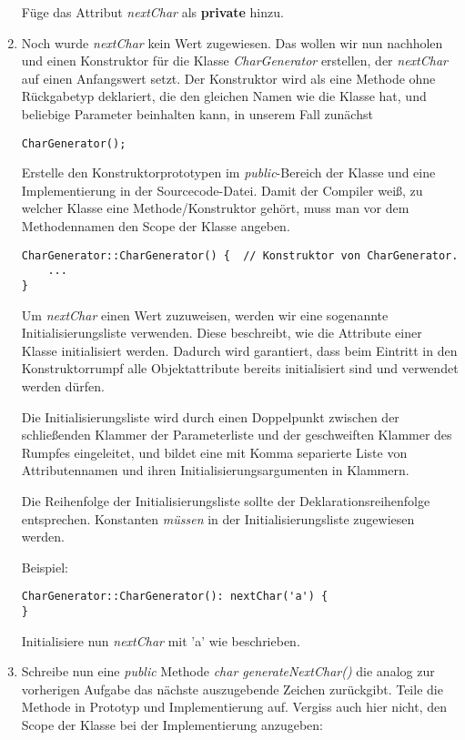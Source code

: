 \begin{enumerate}
Füge das Attribut \emph{nextChar} als \textbf{private} hinzu.

\item
Noch wurde \emph{nextChar} kein Wert zugewiesen.
Das wollen wir nun nachholen und einen Konstruktor für die Klasse \emph{CharGenerator} erstellen, der \emph{nextChar} auf einen Anfangswert setzt.
Der Konstruktor wird als eine Methode ohne Rückgabetyp deklariert, die den gleichen Namen wie die Klasse hat, und beliebige Parameter beinhalten kann, in unserem Fall zunächst 
\begin{lstlisting}
CharGenerator();
\end{lstlisting}

Erstelle den Konstruktorprototypen im \emph{public}-Bereich der Klasse und eine Implementierung in der Sourcecode-Datei. Damit der Compiler weiß, zu welcher Klasse eine Methode/Konstruktor gehört, muss man vor dem Methodennamen den Scope der Klasse angeben.

\begin{lstlisting}
CharGenerator::CharGenerator() {  // Konstruktor von CharGenerator.
	...
}
\end{lstlisting}

Um \emph{nextChar} einen Wert zuzuweisen, werden wir eine sogenannte Initialisierungsliste verwenden.
Diese beschreibt, wie die Attribute einer Klasse initialisiert werden.
Dadurch wird garantiert, dass beim Eintritt in den Konstruktorrumpf alle Objektattribute bereits initialisiert sind und verwendet werden dürfen.

Die Initialisierungsliste wird durch einen Doppelpunkt zwischen der schließenden Klammer der Parameterliste und der geschweiften Klammer des Rumpfes eingeleitet, und bildet eine mit Komma separierte Liste von Attributennamen und ihren Initialisierungsargumenten in Klammern.

Die Reihenfolge der Initialisierungsliste sollte der Deklarationsreihenfolge entsprechen.
Konstanten \emph{müssen} in der Initialisierungsliste zugewiesen werden.

Beispiel:

\begin{lstlisting}
CharGenerator::CharGenerator(): nextChar('a') {
}
\end{lstlisting}

Initialisiere nun \emph{nextChar} mit 'a' wie beschrieben.

\item
Schreibe nun eine \emph{public} Methode \emph{char generateNextChar()} die analog zur vorherigen Aufgabe das nächste auszugebende Zeichen zurückgibt.
Teile die Methode in Prototyp und Implementierung auf.
Vergiss auch hier nicht, den Scope der Klasse bei der Implementierung anzugeben:


\end{enumerate}
